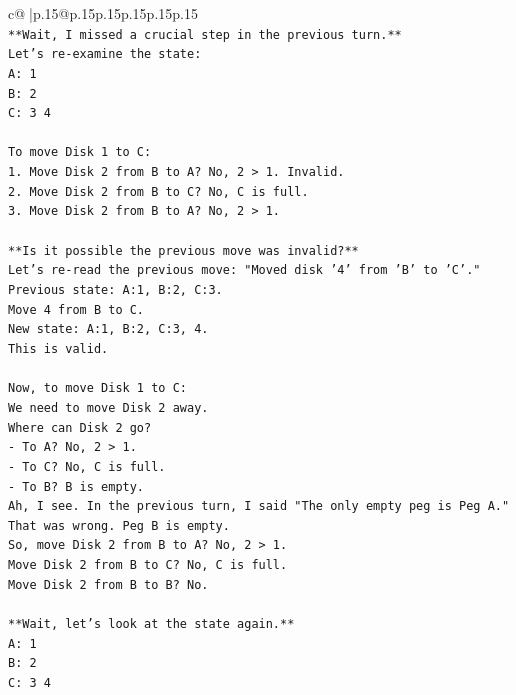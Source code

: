 \documentclass{article}
\begin{document}
{\begin{supertabular}{c@{$\;$}|p{.15\linewidth}@{}p{.15\linewidth}p{.15\linewidth}p{.15\linewidth}p{.15\linewidth}p{.15\linewidth}}
{{{\\ 
\texttt{**Wait, I missed a crucial step in the previous turn.**} \\
\texttt{Let's re{-}examine the state:} \\
\texttt{A: 1} \\
\texttt{B: 2} \\
\texttt{C: 3 4} \\
\\ 
\texttt{To move Disk 1 to C:} \\
\texttt{1. Move Disk 2 from B to A? No, 2 > 1. Invalid.} \\
\texttt{2. Move Disk 2 from B to C? No, C is full.} \\
\texttt{3. Move Disk 2 from B to A? No, 2 > 1.} \\
\\ 
\texttt{**Is it possible the previous move was invalid?**} \\
\texttt{Let's re{-}read the previous move: "Moved disk '4' from 'B' to 'C'."} \\
\texttt{Previous state: A:1, B:2, C:3.} \\
\texttt{Move 4 from B to C.} \\
\texttt{New state: A:1, B:2, C:3, 4.} \\
\texttt{This is valid.} \\
\\ 
\texttt{Now, to move Disk 1 to C:} \\
\texttt{We need to move Disk 2 away.} \\
\texttt{Where can Disk 2 go?} \\
\texttt{{-} To A? No, 2 > 1.} \\
\texttt{{-} To C? No, C is full.} \\
\texttt{{-} To B? B is empty.} \\
\texttt{Ah, I see. In the previous turn, I said "The only empty peg is Peg A." That was wrong. Peg B is empty.} \\
\texttt{So, move Disk 2 from B to A? No, 2 > 1.} \\
\texttt{Move Disk 2 from B to C? No, C is full.} \\
\texttt{Move Disk 2 from B to B? No.} \\
\\ 
\texttt{**Wait, let's look at the state again.**} \\
\texttt{A: 1} \\
\texttt{B: 2} \\
\texttt{C: 3 4} \\
}}}
\end{supertabular}}
\end{document}
